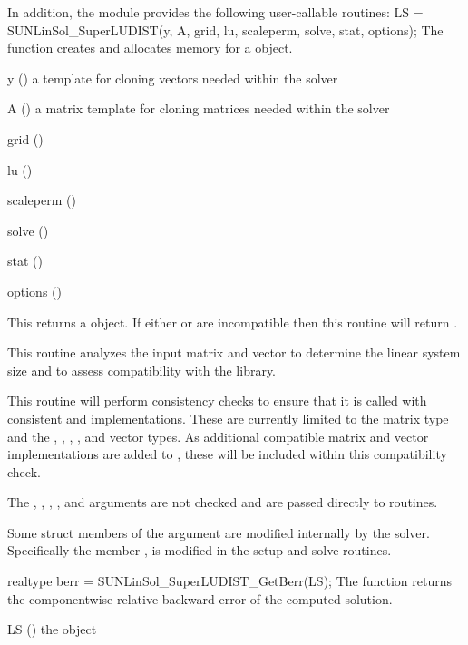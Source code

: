 In addition, the module {\sunlinsolsludist} provides the following user-callable routines:
{
  LS = SUNLinSol\_SuperLUDIST(y, A, grid, lu, scaleperm, solve, stat, options);
}
{
  The function  creates and allocates memory for a
  {\sunlinsolsludist} object.
}
{
  \begin{args}[options]
  \item[y] ()
    a template for cloning vectors needed within the solver
  \item[A] ()
    a {\sunmatslunrloc} matrix template for cloning matrices needed
    within the solver
  \item[grid] ()
  \item[lu] ()
  \item[scaleperm] ()
  \item[solve] ()
  \item[stat] ()
  \item[options] ()
  \end{args}
}
{
  This returns a  object.  If either  or
   are incompatible then this routine will return .
}
{
  This routine analyzes the input matrix and vector to determine the
  linear system size and to assess compatibility with the {\superludist}
  library.

  This routine will perform consistency checks to ensure that it is
  called with consistent {\nvector} and {\sunmatrix} implementations.
  These are currently limited to the {\sunmatslunrloc} matrix type
  and the {\nvecs}, {\nvecp}, {\nvecph}, {\nvecopenmp}, and {\nvecpthreads}
  vector types. As additional compatible matrix and vector implementations
  are added to {\sundials}, these will be included within this compatibility
  check.

  The , , , , and  arguments
  are not checked and are passed directly to {\superludist} routines.

  Some struct members of the  argument are modified internally
  by the {\sunlinsolsludist} solver. Specifically the member ,
  is modified in the setup and solve routines.
}

{
  realtype berr = SUNLinSol\_SuperLUDIST\_GetBerr(LS);
}
{
  The function  returns the componentwise
  relative backward error of the computed solution.
}
{
  \begin{args}[LS]
  \item[LS] ()
    the {\sunlinsolsludist} object
  \end{args}
}
{
}
{
}

